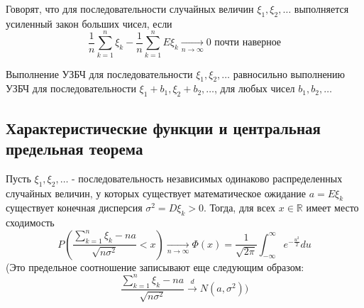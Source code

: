 \begin{definition}
	Говорят, что для последовательности случайных величин $\xi_1, \xi_2, \dots$ выполняется усиленный закон больших чисел, если
	\[ \frac{1}{n} \sum_{k=1}^{n} \xi_k - \frac{1}{n} \sum_{k=1}^{n} E \xi_k \underset{n \to \infty}{\to} 0 \text{ почти наверное} \]
\end{definition}
\begin{remark}
	Выполнение УЗБЧ для последовательности $\xi_1, \xi_2, \dots$ равносильно выполнению УЗБЧ для последовательности $\xi_1 + b_1, \xi_2 + b_2, \dots$, для любых чисел $b_1, b_2, \dots$
\end{remark}

\subsection{Характеристические функции и центральная предельная теорема}

\begin{theorem}
	Пусть $\xi_1, \xi_2, \dots$ - последовательность независимых одинаково распределенных случайных величин, у которых существует математическое ожидание $a = E\xi_k$  существует конечная дисперсия $\sigma^2 = D\xi_k > 0$. Тогда, для всех $x \in \mathbb{R}$ имеет место сходимость
	\[ P \left( \frac{\sum\limits_{k=1}^{n} \xi_k - na}{\sqrt{n \sigma^2}} < x \right) \underset{n \to \infty}{\to} \Phi (x) = \frac{1}{\sqrt{2 \pi}} \int_{- \infty}^{\infty} e^{- \frac{u^2}{2}}du \]
	(Это предельное соотношение записывают еще следующим образом:
	\[ \frac{\sum\limits_{k=1}^{n} \xi_k - na}{\sqrt{n \sigma^2}} \overset{d}{\to} N (a, \sigma^2) ) \]
\end{theorem}

